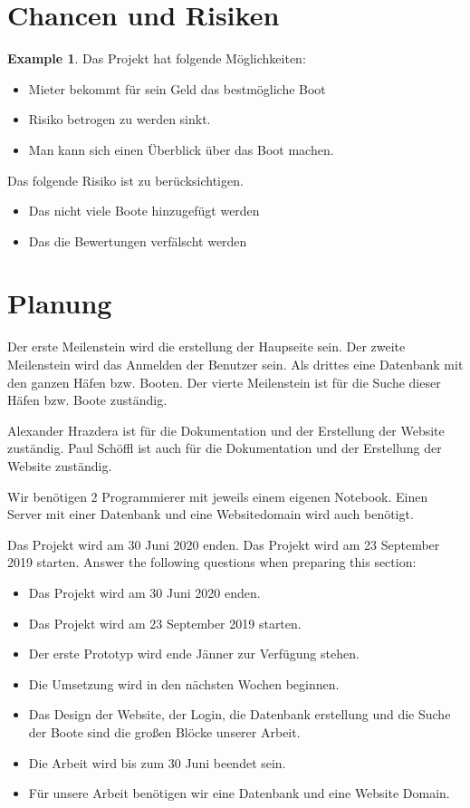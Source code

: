 \documentclass[12pt]{article}
\theoremstyle{definition}
\newtheorem{example}{Example}
\newenvironment{explanation}{%
   \setlength{\parindent}{0pt}
   \itshape
   \color{blue}
}{}
\begin{document}
\pagebreak
\section{Chancen und Risiken}
\begin{example}
Das Projekt hat folgende Möglichkeiten:
\begin{itemize}
\item Mieter bekommt für sein Geld das bestmögliche Boot
\item Risiko betrogen zu werden sinkt.
\item Man kann sich einen Überblick über das Boot machen.
\end{itemize}

Das folgende Risiko ist zu berücksichtigen.
\begin{itemize}
\item Das nicht viele Boote hinzugefügt werden
\item Das die Bewertungen verfälscht werden
\end{itemize}

\end{example}

\pagebreak
\section{Planung}
\begin{explanation}
Der erste Meilenstein wird die erstellung der Haupseite sein.
Der zweite Meilenstein wird das Anmelden der Benutzer sein.
Als drittes eine Datenbank mit den ganzen Häfen bzw. Booten.
Der vierte Meilenstein ist für die Suche dieser Häfen bzw. Boote zuständig.

Alexander Hrazdera ist für die Dokumentation und der Erstellung der Website zuständig.
Paul Schöffl ist auch für die Dokumentation und der Erstellung der Website zuständig. 

Wir benötigen 2 Programmierer mit jeweils einem eigenen Notebook. Einen Server mit einer Datenbank und eine Websitedomain wird auch benötigt.

Das Projekt wird am 30 Juni 2020 enden.
Das Projekt wird am 23 September 2019 starten. 
Answer the following questions when preparing this section:
\begin{itemize}
\item Das Projekt wird am 30 Juni 2020 enden.
\item Das Projekt wird am 23 September 2019 starten.
\item Der erste Prototyp wird ende Jänner zur Verfügung stehen.
\item Die Umsetzung wird in den nächsten Wochen beginnen.
\item Das Design der Website, der Login, die Datenbank erstellung und die Suche der Boote sind die großen Blöcke unserer Arbeit.
\item Die Arbeit wird bis zum 30 Juni beendet sein.
\item Für unsere Arbeit benötigen wir eine Datenbank und eine Website Domain.
\end{itemize}
\end{explanation}
\end{document}
